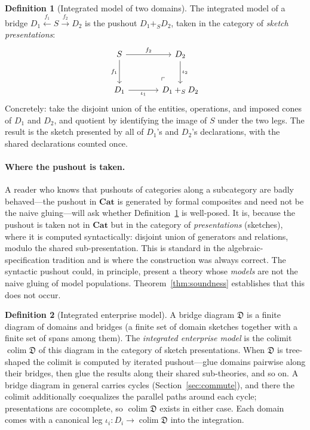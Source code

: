 \documentclass[11pt]{article}
\theoremstyle{plain}
\theoremstyle{definition}
\newtheorem{definition}{Definition}
\newcommand{\Cat}{\mathbf{Cat}}
\begin{document}
\begin{definition}[Integrated model of two domains]\label{def:integration}
The integrated model of a bridge $D_1 \xleftarrow{f_1} S \xrightarrow{f_2} D_2$ is the pushout $D_1 +_S D_2$, taken in the category of \emph{sketch presentations}:
\[
\begin{tikzcd}[column sep=large,row sep=large]
S \arrow[r,"f_2"] \arrow[d,"f_1"'] & D_2 \arrow[d,"\iota_2"] \\
D_1 \arrow[r,"\iota_1"'] & D_1 +_S D_2 \arrow[ul, phantom, "\ulcorner"', very near start]
\end{tikzcd}
\]
Concretely: take the disjoint union of the entities, operations, and imposed cones of $D_1$ and $D_2$, and quotient by identifying the image of $S$ under the two legs. The result is the sketch presented by all of $D_1$'s and $D_2$'s declarations, with the shared declarations counted once.
\end{definition}

\paragraph{Where the pushout is taken.} A reader who knows that pushouts of categories along a subcategory are badly behaved---the pushout in $\Cat$ is generated by formal composites and need not be the naive gluing---will ask whether Definition~\ref{def:integration} is well-posed. It is, because the pushout is taken not in $\Cat$ but in the category of \emph{presentations} (sketches), where it is computed syntactically: disjoint union of generators and relations, modulo the shared sub-presentation. This is standard in the algebraic-specification tradition \cite{sannella-tarlecki,pwc2005} and is where the construction was always correct. The syntactic pushout could, in principle, present a theory whose \emph{models} are not the naive gluing of model populations. Theorem~\ref{thm:soundness} establishes that this does not occur.

\begin{definition}[Integrated enterprise model]\label{def:colimit}
A bridge diagram $\mathfrak{D}$ is a finite diagram of domains and bridges (a finite set of domain sketches together with a finite set of spans among them). The \emph{integrated enterprise model} is the colimit $\operatorname{colim}\mathfrak{D}$ of this diagram in the category of sketch presentations. When $\mathfrak{D}$ is tree-shaped the colimit is computed by iterated pushout---glue domains pairwise along their bridges, then glue the results along their shared sub-theories, and so on. A bridge diagram in general carries cycles (Section~\ref{sec:commute}), and there the colimit additionally coequalizes the parallel paths around each cycle; presentations are cocomplete, so $\operatorname{colim}\mathfrak{D}$ exists in either case. Each domain comes with a canonical leg $\iota_i\colon D_i \to \operatorname{colim}\mathfrak{D}$ into the integration.
\end{definition}
\end{document}

